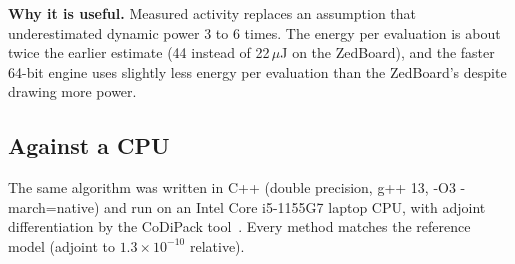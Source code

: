 \documentclass[11pt,a4paper]{article}
\newcommand{\useful}[1]{\par\noindent\textbf{\textcolor{accent}{Why it is useful.}} #1\par}
\begin{document}
\useful{Measured activity replaces an assumption that underestimated dynamic power 3 to 6
times. The energy per evaluation is about twice the earlier estimate (44 instead of
22\,$\mu$J on the ZedBoard), and the faster 64-bit engine uses slightly less energy per
evaluation than the ZedBoard's despite drawing more power.}

\subsection{Against a CPU}
The same algorithm was written in C++ (double precision, g++ 13, -O3 -march=native) and
run on an Intel Core i5-1155G7 laptop CPU, with adjoint differentiation by the CoDiPack
tool~\cite{codipack}. Every method matches the reference model (adjoint to
$1.3\times10^{-10}$ relative).
\end{document}
